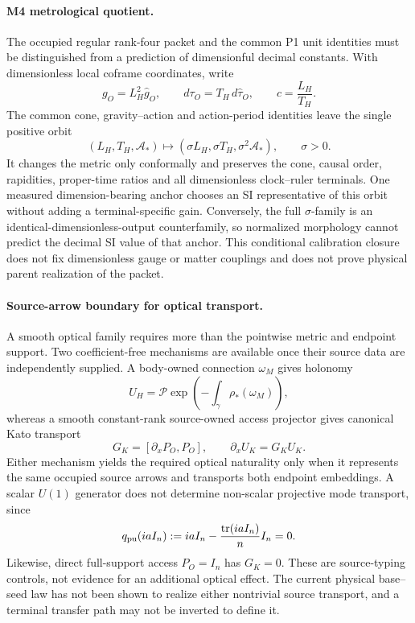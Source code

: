\documentclass[11pt]{article}
\begin{document}
\paragraph{M4 metrological quotient.}
The occupied regular rank-four packet and the common P1 unit identities must
be distinguished from a prediction of dimensionful decimal constants. With
dimensionless local coframe coordinates, write
\begin{equation}
 g_O=L_H^2\widehat g_O,
 \qquad d\tau_O=T_H\,d\widehat\tau_O,
 \qquad c=\frac{L_H}{T_H}.
 \label{eq:m4-metrological-frame}
\end{equation}
The common cone, gravity--action and action-period identities leave the single
positive orbit
\begin{equation}
 (L_H,T_H,\mathcal A_*)
 \longmapsto
 (\sigma L_H,\sigma T_H,\sigma^2\mathcal A_*),
 \qquad \sigma>0.
 \label{eq:m4-metrological-orbit}
\end{equation}
It changes the metric only conformally and preserves the cone, causal order,
rapidities, proper-time ratios and all dimensionless clock--ruler terminals.
One measured dimension-bearing anchor chooses an SI representative of this
orbit without adding a terminal-specific gain. Conversely, the full
\(\sigma\)-family is an identical-dimensionless-output counterfamily, so
normalized morphology cannot predict the decimal SI value of that anchor.
This conditional calibration closure does not fix dimensionless gauge or
matter couplings and does not prove physical parent realization of the packet.

\paragraph{Source-arrow boundary for optical transport.}
A smooth optical family requires more than the pointwise metric and endpoint
support.  Two coefficient-free mechanisms are available once their source
data are independently supplied.  A body-owned connection \(\omega_M\) gives
holonomy
\begin{equation}
 U_H=\mathcal P\exp\!\left(-\int_\gamma\rho_*(\omega_M)\right),
 \label{eq:body-optical-holonomy}
\end{equation}
whereas a smooth constant-rank source-owned access projector gives canonical
Kato transport
\begin{equation}
 G_K=[\partial_xP_O,P_O],\qquad \partial_xU_K=G_KU_K.
 \label{eq:kato-optical-transport}
\end{equation}
Either mechanism yields the required optical naturality only when it
represents the same occupied source arrows and transports both endpoint
embeddings.  A scalar \(U(1)\) generator does not determine non-scalar
projective mode transport, since
\begin{equation}
 q_{\rm pu}(iaI_n)
 :=iaI_n-\frac{\operatorname{tr}(iaI_n)}{n}I_n=0.
 \label{eq:scalar-projective-null}
\end{equation}
Likewise, direct full-support access \(P_O=I_n\) has \(G_K=0\).  These are
source-typing controls, not evidence for an additional optical effect.  The
current physical base--seed law has not been shown to realize either
nontrivial source transport, and a terminal transfer path may not be inverted
to define it.
\end{document}

